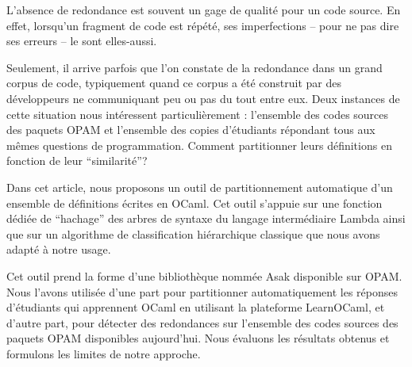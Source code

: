 L'absence de redondance est souvent un gage de qualité pour un code
source. En effet, lorsqu'un fragment de code est répété, ses
imperfections -- pour ne pas dire ses erreurs -- le sont elles-aussi.

Seulement, il arrive parfois que l'on constate de la redondance dans
un grand corpus de code, typiquement quand ce corpus a été construit
par des développeurs ne communiquant peu ou pas du tout entre
eux. Deux instances de cette situation nous intéressent
particulièrement : l'ensemble des codes sources des paquets OPAM et
l'ensemble des copies d'étudiants répondant tous aux mêmes questions
de programmation. Comment partitionner leurs définitions en fonction
de leur ``similarité''?

Dans cet article, nous proposons un outil de partitionnement
automatique d'un ensemble de définitions écrites en OCaml. Cet outil
s'appuie sur une fonction dédiée de ``hachage'' des arbres de syntaxe
du langage intermédiaire Lambda ainsi que sur un algorithme de
classification hiérarchique classique que nous avons adapté à notre
usage.

Cet outil prend la forme d'une bibliothèque nommée Asak disponible sur
OPAM. Nous l'avons utilisée d'une part pour partitionner
automatiquement les réponses d'étudiants qui apprennent OCaml en
utilisant la plateforme LearnOCaml, et d'autre part, pour détecter des
redondances sur l'ensemble des codes sources des paquets OPAM
disponibles aujourd'hui. Nous évaluons les résultats obtenus
et formulons les limites de notre approche.
